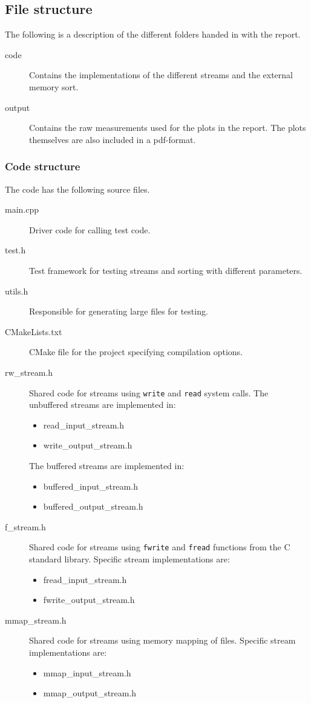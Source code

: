 \documentclass[a4paper,12pt]{article}
\begin{document}
\subsection{File structure}
The following is a description of the different folders handed in with
the report.
\begin{description}
\item[code] Contains the implementations of the different streams and
  the external memory sort.

\item[output] Contains the raw measurements used for the plots in the
  report. The plots themselves are also included in a pdf-format.
\end{description}

\subsubsection{Code structure}
The code has the following source files.
\begin{description}
\item[main.cpp] Driver code for calling test code.
\item[test.h] Test framework for testing streams and sorting with
  different parameters.
\item[utils.h] Responsible for generating large files for testing.
\item[CMakeLists.txt] CMake file for the project specifying
  compilation options.

\item[rw\_stream.h] Shared code for streams using \texttt{write} and
  \texttt{read} system calls. The unbuffered streams are implemented
  in:
  \begin{itemize}
  \item read\_input\_stream.h
  \item write\_output\_stream.h
  \end{itemize}
  The buffered streams are implemented in:
  \begin{itemize}
  \item buffered\_input\_stream.h
  \item buffered\_output\_stream.h
  \end{itemize}

\item[f\_stream.h] Shared code for streams using \texttt{fwrite} and
  \texttt{fread} functions from the C standard library. Specific
  stream implementations are:
  \begin{itemize}
  \item fread\_input\_stream.h
  \item fwrite\_output\_stream.h
  \end{itemize}

\item[mmap\_stream.h] Shared code for streams using memory mapping of
  files. Specific stream implementations are:
  \begin{itemize}
  \item mmap\_input\_stream.h
  \item mmap\_output\_stream.h
  \end{itemize}
\end{description}
\end{document}
